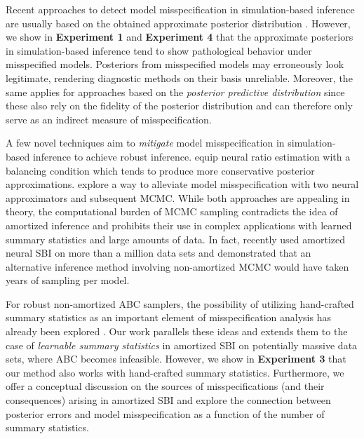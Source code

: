 \documentclass[twoside,11pt]{article}
\newcommand{\numberGaussianMeans}{1}
\newcommand{\numberCS}{3}
\newcommand{\numberDDM}{4}
\newcommand{\0}{\boldsymbol{0}}
\newcommand{\eg}{e.\,g.}
\renewcommand{\cite}[1]{\citep{#1}}
\begin{document}
Recent approaches to detect model misspecification in simulation-based inference are usually based on the obtained approximate posterior distribution \citep[e.g.,][]{hermans2021averting, dellaporta_robust_2022, leclercq_simulation-based_2022}.
However, we show in \textbf{Experiment \numberGaussianMeans} and \textbf{Experiment \numberDDM} that the approximate posteriors in simulation-based inference tend to show pathological behavior under misspecified models. 
Posteriors from misspecified models may erroneously look legitimate, rendering diagnostic methods on their basis unreliable.
Moreover, the same applies for approaches based on the \textit{posterior predictive distribution} \citep{burkner_approximate_2020, gabry_visualization_2019, vehtari_survey_2012} since these also rely on the fidelity of the posterior distribution and can therefore only serve as an indirect measure of misspecification.

A few novel techniques aim to \emph{mitigate} model misspecification in simulation-based inference to achieve robust inference.
\citet{delaunoy_towards_2022} equip neural ratio estimation \cite{ratios} with a balancing condition which tends to produce more conservative posterior approximations.
\citet{ward_robust_2022} explore a way to alleviate model misspecification with two neural approximators and subsequent MCMC.
While both approaches are appealing in theory, the computational burden of MCMC sampling contradicts the idea of amortized inference and prohibits their use in complex applications with learned summary statistics and large amounts of data.
In fact, \citet{von_krause_mental_2022} recently used amortized neural SBI on more than a million data sets and demonstrated that an alternative inference method involving non-amortized MCMC would have taken years of sampling per model.

For robust non-amortized ABC samplers, the possibility of utilizing hand-crafted summary statistics as an important element of misspecification analysis has already been explored \cite{frazier_model_2020, frazier_robust_2021}.
Our work parallels these ideas and extends them to the case of \textit{learnable summary statistics} in amortized SBI on potentially massive data sets, where ABC becomes infeasible.
However, we show in \textbf{Experiment \numberCS} that our method also works with hand-crafted summary statistics.
Furthermore, we offer a conceptual discussion on the sources of misspecifications (and their consequences) arising in amortized SBI and explore the connection between posterior errors and model misspecification as a function of the number of summary statistics.
\end{document}
